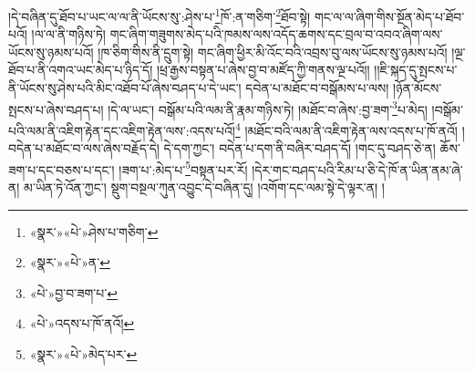 །དེ་བཞིན་དུ་ཐོབ་པ་ཡང་ལ་ལ་ནི་ཡོངས་སུ་:ཤེས་པ་\footnote{«སྣར་»«པེ་»ཤེས་པ་གཅིག་}ཁོ་:ན་གཅིག་\footnote{«སྣར་»«པེ་»ན་}ཐོབ་སྟེ། གང་ལ་ལ་ཞིག་གིས་སྔོན་མེད་པ་ཐོབ་པའོ། །ལ་ལ་ནི་གཉིས་ཏེ། གང་ཞིག་གཟུགས་མེད་པའི་ཁམས་ལས་འདོད་ཆགས་དང་བྲལ་བ་འབའ་ཞིག་ལས་ཡོངས་སུ་ཉམས་པའོ། །ཁ་ཅིག་གིས་ནི་དྲུག་སྟེ། གང་ཞིག་ཕྱིར་མི་འོང་བའི་འབྲས་བུ་ལས་ཡོངས་སུ་ཉམས་པའོ། །ལྔ་ཐོབ་པ་ནི་འགའ་ཡང་མེད་པ་ཉིད་དོ། །ཕྲ་རྒྱས་བསྟན་པ་ཞེས་བྱ་བ་མཛོད་ཀྱི་གནས་ལྔ་པའོ།། །།ཇི་སྐད་དུ་སྤངས་པ་ནི་ཡོངས་སུ་ཤེས་པའི་མིང་འཐོབ་པོ་ཞེས་བཤད་པ་དེ་ཡང་། དབེན་པ་མཐོང་བ་བསྒོམས་པ་ལས། །ཉོན་མོངས་སྤངས་པ་ཞེས་བཤད་པ། །དེ་ལ་ཡང་། བསྒོམ་པའི་ལམ་ནི་རྣམ་གཉིས་ཏེ། །མཐོང་བ་ཞེས་:བྱ་ཟག་\footnote{«པེ་»བྱ་བ་ཟག་པ་}པ་མེད། །བསྒོམ་པའི་ལམ་ནི་འཇིག་རྟེན་དང་འཇིག་རྟེན་ལས་:འདས་པའོ།\footnote{«པེ་»འདས་པ་ཁོ་ནའོ།} །མཐོང་བའི་ལམ་ནི་འཇིག་རྟེན་ལས་འདས་པ་ཁོ་ནའོ། །བདེན་པ་མཐོང་བ་ལས་ཞེས་བརྗོད་དེ། དེ་དག་ཀྱང་། བདེན་པ་དག་ནི་བཞིར་བཤད་དོ། །གང་དུ་བཤད་ཅེ་ན། ཆོས་ཟག་པ་དང་བཅས་པ་དང་། །ཟག་པ་:མེད་པ་\footnote{«སྣར་»«པེ་»མེད་པར་}བསྟན་པར་རོ། །དེར་གང་བཤད་པའི་རིམ་པ་ཅི་དེ་ཁོ་ན་ཡིན་ནམ་ཞེ་ན། མ་ཡིན་ཏེ་འོན་ཀྱང་། སྡུག་བསྔལ་ཀུན་འབྱུང་དེ་བཞིན་དུ། །འགོག་དང་ལམ་སྟེ་དེ་ལྟར་ན། །
